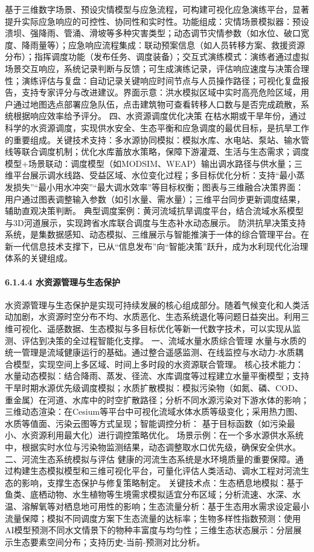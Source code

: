 基于三维数字场景、预设灾情模型与应急流程，可构建可视化应急演练平台，显著提升实际应急响应的可控性、协同性和实时性。功能组成：灾情场景模拟器：预设溃坝、强降雨、管涌、滑坡等多种灾害类型；动态调节灾情参数（如水位、破口宽度、降雨量等）；应急响应流程集成：联动预案信息（如人员转移方案、救援资源分布）；指挥调度功能（发布任务、调度装备）；交互式演练模式：演练者通过虚拟场景交互响应，系统记录判断与反馈；可生成演练记录，评估响应速度与决策合理性；演练评估与复盘：自动记录关键响应时间节点与人员操作路径；可视化复盘报告，支持专家评分与改进建议。界面示意：洪水模拟区域中实时高亮危险区域，用户通过地图选点部署应急队伍，点击建筑物可查看转移人口数与是否完成疏散，系统根据响应效率给予评分。 四、水资源调度优化决策 在枯水期或干旱年份，通过科学的水资源调度，实现供水安全、生态平衡和应急调度的最优目标，是抗旱工作的重要组成。关键技术支持：多水源协同模拟：模拟水库、水电站、泵站、输水管线等联合调度机制；优化水库蓄放水策略，保障下游灌溉、生活与生态需求；调度模型+场景联动：调度模型（如MODSIM、WEAP）输出调水路径与供水量；三维平台展示调水线路、受益区域、水位变化过程；多目标优化分析：支持``最小蒸发损失''``最小用水冲突''``最大调水效率''等目标权衡；图表与三维融合决策界面：用户通过图表调整输入参数（如引水量、需水量）；三维平台同步更新调度结果，辅助直观决策判断。 典型调度案例：黄河流域抗旱调度平台，结合流域水系模型与3D河道展示，实现跨省水库联合调度与生态补水动态展示。 防洪抗旱决策支持系统，是集数据感知、动态模拟、三维展示与智能推演于一体的综合管理平台。在新一代信息技术支撑下，已从``信息发布''向``智能决策''跃升，成为水利现代化治理体系的关键组成。 \paragraph{6.1.4.4 水资源管理与生态保护}\label{ux6c34ux8d44ux6e90ux7ba1ux7406ux4e0eux751fux6001ux4fddux62a4} 水资源管理与生态保护是实现可持续发展的核心组成部分。随着气候变化和人类活动加剧，水资源时空分布不均、水质恶化、生态系统退化等问题日益突出。利用三维可视化、遥感数据、生态模拟与多目标优化等新一代数字技术，可以实现从监测、评估到决策的全过程智能化支撑。 一、流域水量水质综合管理 水量与水质的统一管理是流域健康运行的基础。通过整合遥感监测、在线监控与水动力-水质耦合模型，实现空间上多区域、时间上多时段的水资源联合管理。 核心技术能力：水量动态模拟：结合降雨、蒸发、径流、水库调度等过程建立水量平衡模型；支持干旱时期水源优先级调度模拟；水质扩散模拟：模拟污染物（如氮、磷、COD、重金属）在河道、水库中的时空扩散路径；分析不同水源污染对下游水体的影响；三维动态渲染：在Cesium等平台中可视化流域水体水质等级变化；采用热力图、水质等值面、污染云图等方式呈现；智能调控分析： 基于目标函数（如污染最小、水资源利用最大化）进行调控策略优化。 场景示例：在一个多水源供水系统中，根据实时水位与污染物监测结果，动态调整取水口优先级，确保安全供水。 二、河流生态系统模拟与评估 健康的河流生态系统是水环境质量的重要保障。通过构建生态模拟模型和三维可视化平台，可量化评估人类活动、调水工程对河流生态的影响，支撑生态保护与修复策略制定。 关键技术点：生态栖息地模拟：基于鱼类、底栖动物、水生植物等生境需求模拟适宜分布区域；分析流速、水深、水温、溶解氧等对栖息地可用性的影响；生态流量分析：基于生态用水需求设定最小流量保障；模拟不同调度方案下生态流量的达标率；生物多样性指数预测：使用AI模型预测不同水文情景下的物种丰富度与均匀性；三维生态状态展示：分层展示生态要素空间分布；支持历史-当前-预测对比分析。 